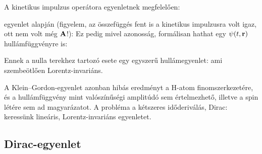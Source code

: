    A kinetikus impulzus operátora  egyenletnek megfelelően: 
   
    egyenlet alapján (figyelem, az összefüggés fent is a kinetikus impulzusra volt igaz, ott nem volt még $\mathbf{A}$!):
   Ez pedig mivel azonosság, formálisan hathat egy $\psi(t,\mathbf{r})$ hullámfüggvényre is:
   
   Ennek a nulla terekhez tartozó esete egy egyszerű hullámegyenlet: 
   ami szembeötlően Lorentz-invariáns. 
   
   A Klein--Gordon-egyenlet azonban hibás eredményt a H-atom finomszerkezetére, és a hullámfüggvény mint valószínűségi amplitúdó sem értelmezhető, illetve a spin létére sem ad magyarázatot. A probléma a kétszeres időderiválás, Dirac: keressünk lineáris, Lorentz-invariáns egyenletet.
   
  \subsection{Dirac-egyenlet}
   
